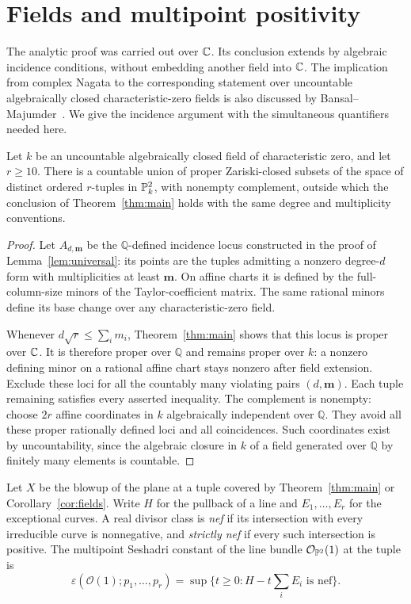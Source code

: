 \section{Fields and multipoint positivity}\label{sec:consequences}

The analytic proof was carried out over $\mathbb C$. Its conclusion extends by
algebraic incidence conditions, without embedding another field into
$\mathbb C$. The implication from complex Nagata to the corresponding statement
over uncountable algebraically closed characteristic-zero fields is also
discussed by Bansal--Majumder~\cite{BM2025}. We give the incidence
argument with the simultaneous quantifiers needed here.

\begin{corollary}\label{cor:fields}
Let $k$ be an uncountable algebraically closed field of characteristic
zero, and let $r\ge10$. There is a countable union of proper Zariski-closed
subsets of the space of distinct ordered $r$-tuples in $\mathbb P^2_k$, with
nonempty complement, outside which the conclusion of
Theorem~\ref{thm:main} holds with the same degree and multiplicity
conventions.
\end{corollary}
\begin{proof}
Let $A_{d,\mathbf m}$ be the $\mathbb Q$-defined incidence locus
constructed in the proof of Lemma~\ref{lem:universal}: its points are
the tuples admitting a nonzero degree-$d$ form with multiplicities at
least $\mathbf m$. On affine charts it is defined by the full-column-size
minors of the Taylor-coefficient matrix. The same rational minors define
its base change over any characteristic-zero field.

Whenever $d\sqrt r\le\sum_i m_i$, Theorem~\ref{thm:main} shows that
this locus is proper over $\mathbb C$. It is therefore proper over $\mathbb Q$
and remains proper over $k$: a nonzero defining minor on a rational affine
chart stays nonzero after field extension. Exclude these loci for all the
countably many violating pairs $(d,\mathbf m)$. Each tuple remaining
satisfies every asserted inequality. The complement is nonempty: choose
$2r$ affine coordinates in $k$ algebraically independent over $\mathbb Q$.
They avoid all these proper rationally defined loci and all coincidences.
Such coordinates exist by uncountability, since the algebraic closure in
$k$ of a field generated over $\mathbb Q$ by finitely many elements is
countable.
\end{proof}

Let $X$ be the blowup of the plane at a tuple covered by
Theorem~\ref{thm:main} or Corollary~\ref{cor:fields}. Write $H$ for the
pullback of a line and $E_1,\ldots,E_r$ for the exceptional curves.
A real divisor class is \emph{nef} if its intersection with every
irreducible curve is nonnegative, and \emph{strictly nef} if every such
intersection is positive. The multipoint Seshadri constant of the line
bundle $\mathcal O_{\mathbb P^2}(1)$ at the tuple is
\[
 \varepsilon(\mathcal O(1);p_1,\ldots,p_r)
 =\sup\{t\ge0:H-t\textstyle\sum_iE_i\text{ is nef}\}.
\]

